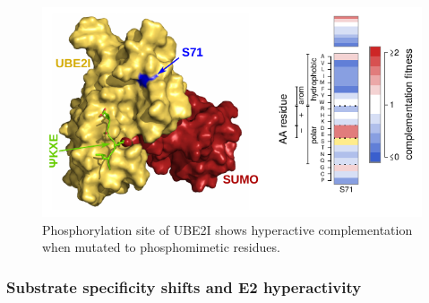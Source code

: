 \begin{figure}
	\centering
	\includegraphics[width=\textwidth]{img/phosphosite.pdf}
	\caption{Phosphorylation site of UBE2I shows hyperactive complementation when mutated to phosphomimetic residues.}
	\label{fig:phosphosite}
\end{figure}


\subsubsection{Substrate specificity shifts and E2 hyperactivity}

